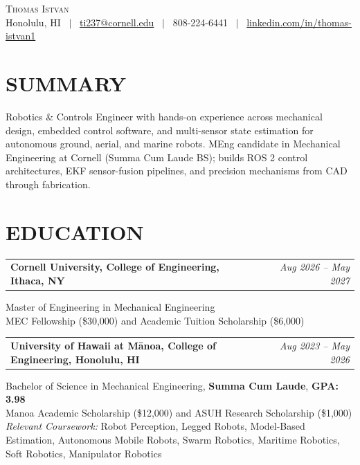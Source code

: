 \documentclass[10.5pt]{article}
\makeatletter
\newcommand{\entryline}[2]{%
  \noindent
  \begin{tabularx}{\linewidth}{@{}X r@{}}
    \textbf{#1} & \textit{#2}
  \end{tabularx}%
  \par
}
\newcommand{\subgap}{\vspace{3pt}}   %
\newcommand{\entrygap}{\vspace{5pt}} %
\makeatother
\begin{document}
\begin{center}
  {\LARGE \scshape Thomas Istvan}\\[0.3em]
  {\small Honolulu, HI \ $\vert$ \ \href{mailto:ti237@cornell.edu}{ti237@cornell.edu} \ $\vert$ \ 808-224-6441 \ $\vert$ \ \href{https://linkedin.com/in/thomas-istvan1}{linkedin.com/in/thomas-istvan1}}
\end{center}
\vspace{-0.3em}

\section{SUMMARY}
\noindent\justifying
Robotics \& Controls Engineer with hands-on experience across mechanical design, embedded control software, and multi-sensor state estimation for autonomous ground, aerial, and marine robots. MEng candidate in Mechanical Engineering at Cornell (Summa Cum Laude BS); builds ROS 2 control architectures, EKF sensor-fusion pipelines, and precision mechanisms from CAD through fabrication.
\par

\section{EDUCATION}

\entryline{Cornell University, College of Engineering, Ithaca, NY}{Aug 2026 -- May 2027}
\subgap

\noindent Master of Engineering in Mechanical Engineering\\
MEC Fellowship (\$30,000) and Academic Tuition Scholarship (\$6,000)
\par
\entrygap

\entryline{University of Hawai\textquotesingle i at M\={a}noa, College of Engineering, Honolulu, HI}{Aug 2023 -- May 2026}
\subgap

\noindent Bachelor of Science in Mechanical Engineering, \textbf{Summa Cum Laude}, \textbf{GPA: 3.98}\\
Manoa Academic Scholarship (\$12,000) and ASUH Research Scholarship (\$1,000)\\
\textit{Relevant Coursework:} Robot Perception, Legged Robots, Model-Based Estimation, Autonomous Mobile Robots, Swarm Robotics, Maritime Robotics, Soft Robotics, Manipulator Robotics
\par

\end{document}
